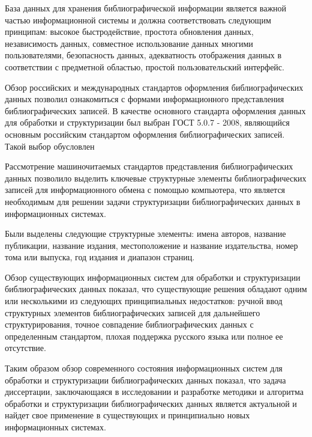 База данных для хранения библиографической информации является важной частью информационной системы и должна соответствовать следующим принципам: высокое быстродействие, простота обновления данных, независимость данных, совместное использование данных многими пользователями, безопасность данных, адекватность отображения данных в соответствии с предметной областью, простой пользовательский интерфейс.

Обзор российских и международных стандартов оформления библиографических данных позволил ознакомиться с формами информационного представления библиографических записей. В качестве основного стандарта оформления данных для обработки и структуризации был выбран ГОСТ 5.0.7 - 2008, являющийся основным российским стандартом оформления библиографических записей. Такой выбор обусловлен 

Рассмотрение машиночитаемых стандартов представления библиографических данных позволило выделить ключевые структурные элементы библиографических записей для информационного обмена с помощью компьютера, что является необходимым для решении задачи структуризации библиографических данных в информационных системах.

Были выделены следующие структурные элементы: имена авторов, название публикации, название издания, местоположение и название издательства, номер тома или выпуска, год издания и диапазон страниц.

Обзор существующих информационных систем для обработки и структуризации библиографических данных показал, что существующие решения обладают одним или несколькими из следующих принципиальных недостатков: ручной ввод структурных элементов библиографических записей для дальнейшего структурирования, точное совпадение библиографических данных с определенным стандартом, плохая поддержка русского языка или полное ее отсутствие.

Таким образом обзор современного состояния информационных систем для обработки и структуризации библиографических данных показал, что задача диссертации, заключающаяся в исследовании и разработке методики и алгоритма обработки и структуризации библиографических данных является актуальной и найдет свое применение в существующих и принципиально новых информационных системах.
